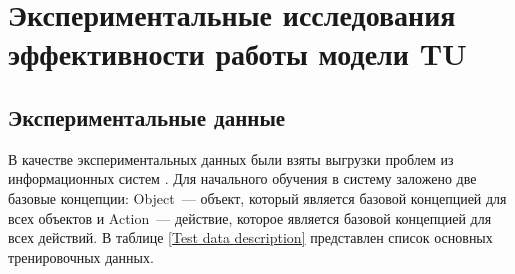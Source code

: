 \chapter{Экспериментальные исследования эффективности работы модели TU}


\section{Экспериментальные данные}
В качестве экспериментальных данных были взяты выгрузки проблем из информационных систем \icl. 
Для начального обучения в систему заложено две базовые концепции: Object~--- объект, который является базовой концепцией для всех объектов и Action~--- действие, которое является базовой концепцией для всех действий. 
В таблице \ref{Test data description} представлен список основных тренировочных данных.

